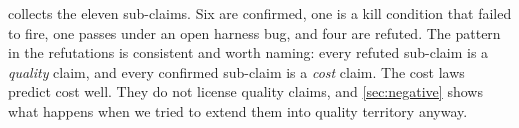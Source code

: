  collects the eleven sub-claims. Six are confirmed, one is
a kill condition that failed to fire, one passes under an open harness bug, and
four are refuted. The pattern in the refutations is consistent and worth naming:
every refuted sub-claim is a \emph{quality} claim, and every confirmed sub-claim
is a \emph{cost} claim. The cost laws predict cost well. They do not license
quality claims, and \cref{sec:negative} shows what happens when we tried to
extend them into quality territory anyway.
